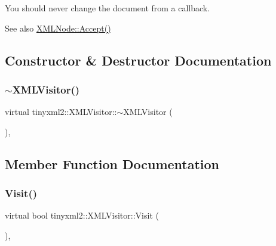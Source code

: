 You should never change the document from a callback.

\begin{DoxySeeAlso}{See also}
\mbox{\hyperlink{classtinyxml2_1_1_x_m_l_node_a81e66df0a44c67a7af17f3b77a152785}{X\+M\+L\+Node\+::\+Accept()}} 
\end{DoxySeeAlso}


\subsection{Constructor \& Destructor Documentation}
\mbox{\label{classtinyxml2_1_1_x_m_l_visitor_a494e72033d646c47d9c65c502ec62364}} 
\subsubsection{\texorpdfstring{$\sim$\+X\+M\+L\+Visitor()}{~XMLVisitor()}}
{\footnotesize\ttfamily virtual tinyxml2\+::\+X\+M\+L\+Visitor\+::$\sim$\+X\+M\+L\+Visitor (\begin{DoxyParamCaption}{ }\end{DoxyParamCaption})\hspace{0.3cm}{\ttfamily [inline]}, {\ttfamily [virtual]}}



\subsection{Member Function Documentation}
\mbox{\label{classtinyxml2_1_1_x_m_l_visitor_adc75bd459fc7ba8223b50f0616767f9a}} 
\subsubsection{\texorpdfstring{Visit()}{Visit()}\hspace{0.1cm}{\footnotesize\ttfamily [1/4]}}
{\footnotesize\ttfamily virtual bool tinyxml2\+::\+X\+M\+L\+Visitor\+::\+Visit (\begin{DoxyParamCaption}\item[{const \mbox{\hyperlink{classtinyxml2_1_1_x_m_l_declaration}{X\+M\+L\+Declaration}} \&}]{ }\end{DoxyParamCaption})\hspace{0.3cm}{\ttfamily [inline]}, {\ttfamily [virtual]}}



